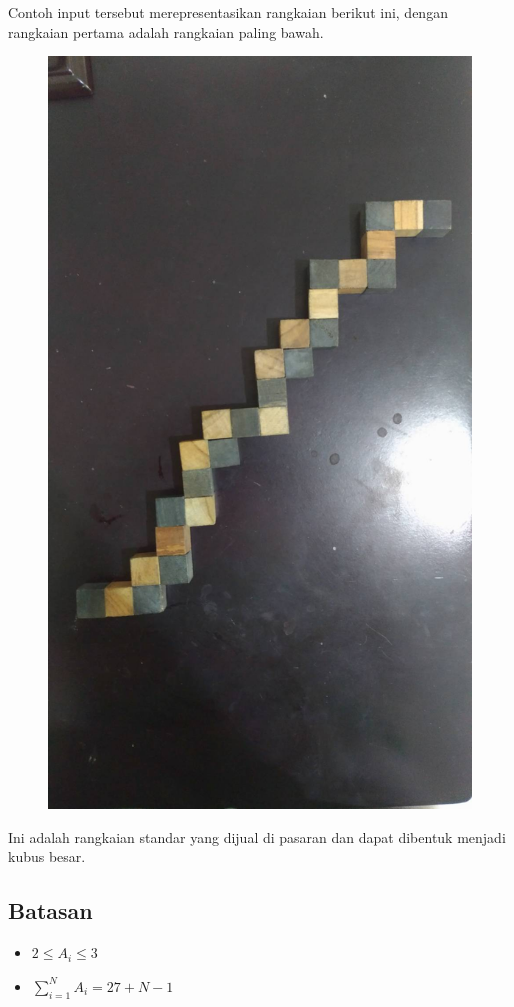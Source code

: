 \documentclass{article}
\begin{document}
\par\noindent Contoh input tersebut merepresentasikan rangkaian berikut ini, dengan rangkaian pertama adalah rangkaian paling bawah.

\begin{figure}[h!]
	\centering
	\includegraphics[width=0.4\linewidth]{sample-input.jpg}
\end{figure}

\par\noindent Ini adalah rangkaian standar yang dijual di pasaran dan dapat dibentuk menjadi kubus besar.

\subsection*{Batasan}

\begin{itemize}
	\item $2 \leq A_i \leq 3$
	\item $\sum_{i=1}^{N} A_i = 27 + N - 1$
\end{itemize}
\end{document}
